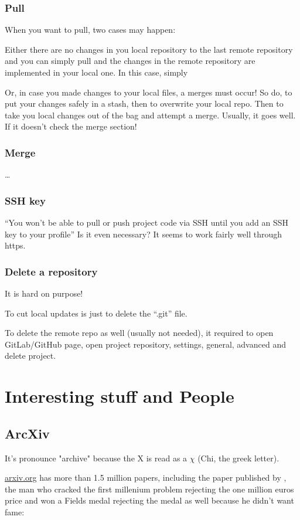 

\subsubsection{Pull}
When you want to pull, two cases may happen: 

Either there are no changes in you local repository to the last remote repository and you can simply pull and the changes in the remote repository are implemented in your local one. In this case, simply 

Or, in case you made changes to your local files, a merges must occur!
So do,  to put your changes safely in a stash, then  to overwrite your local repo. Then  to take you local changes out of the bag and attempt a merge. Usually, it goes well. If it doesn't check the merge section!

\subsubsection{Merge}
\dots

\subsubsection{SSH key}
``You won't be able to pull or push project code via SSH until you add an SSH key to your profile''
Is it even necessary? It seems to work fairly well through https.


\subsubsection{Delete a repository}
It is hard on purpose! 

To cut local updates is just to delete the ``.git'' file.

To delete the remote repo as well (usually not needed), it required to open GitLab/GitHub page, open project repository, settings, general, advanced and delete project.



\section{Interesting stuff and People}

\subsection{ArcXiv}
\par It's pronounce "archive" because the X is read as a $\chi$ (Chi, the greek letter).
\par \href{https://arxiv.org/}{\ul{arxiv.org}} has more than 1.5 million papers, including the paper published by , the man who cracked the first millenium problem rejecting the one million euros price and won a Fields medal rejecting the medal as well because he didn't want fame: 

